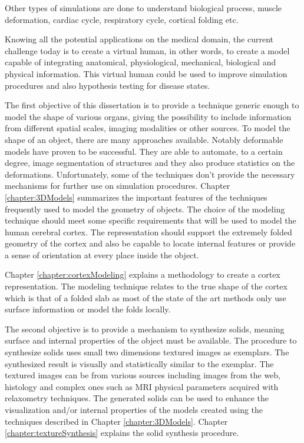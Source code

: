 Other types of simulations are done to understand biological process,
muscle deformation, cardiac cycle, respiratory cycle, cortical folding etc. 

Knowing all the potential applications on the medical domain,
the current challenge today is to create a virtual human, in other words,
to create a model capable of integrating anatomical, physiological, mechanical,  
biological and physical information. 
This virtual human could be used to improve simulation procedures
and also hypothesis testing for disease states. 

The first objective of this dissertation 
is to provide a technique generic enough to model
the shape of various organs, 
giving the possibility to include information 
from different spatial scales, imaging modalities or 
other sources.
To model the shape of an object, there are many approaches available.
Notably deformable models have proven to be successful. 
They are able to automate, to a certain degree, 
image segmentation of structures and they also produce statistics on the deformations. 
Unfortunately, some of the techniques 
don't provide the necessary mechanisms for further use on simulation procedures. 
Chapter \ref{chapter:3DModels} summarizes the important features of the techniques 
frequently used to model the geometry of objects.
The choice of the modeling technique should meet some specific requirements 
that will be used to model the human cerebral cortex. 
The representation should support the extremely 
folded geometry of the cortex
and also be capable to locate 
internal features or 
provide a sense of orientation at every place inside the object. 

Chapter \ref{chapter:cortexModeling} explains 
a methodology to create a cortex representation. 
The modeling technique relates to 
the true shape of the cortex which is that of a folded slab
as most of the state of the art methods only use surface information or 
model the folds locally. 

The second objective 
is to provide a mechanism
to synthesize solids, meaning 
surface and internal properties 
of the object must be available.
The procedure to synthesize solids uses small two dimensions
textured images as exemplars. The synthesized result is visually and statistically 
similar to the exemplar.
The textured images can be from various sources 
including images from the web, 
histology and complex ones such as 
MRI physical parameters acquired with relaxometry techniques.
The generated solids can be used
to enhance the visualization and/or internal properties of the models created
using the techniques described in Chapter \ref{chapter:3DModels}.
Chapter \ref{chapter:textureSynthesis} explains the solid synthesis procedure.

